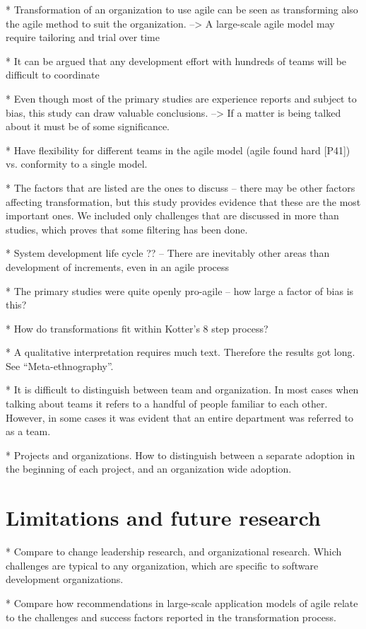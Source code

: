 \documentclass[preprint,authoryear,12pt]{elsarticle}
\begin{document}
* Transformation of an organization to use agile can be seen as transforming
  also the agile method to suit the organization.
  --> A large-scale agile model may require tailoring and trial over time

* It can be argued that any development effort with hundreds of teams will be
  difficult to coordinate

* Even though most of the primary studies are experience reports and subject to
  bias, this study can draw valuable conclusions. --> If a matter is being
  talked about it must be of some significance.

* Have flexibility for different teams in the agile model (agile found
  hard [P41]) vs. conformity to a single model. 

* The factors that are listed are the ones to discuss -- there may be other
  factors affecting transformation, but this study provides evidence that these
  are the most important ones. We included only challenges that are discussed in
  more than studies, which proves that some filtering has been done.

* System development life cycle ?? -- There are inevitably other areas than
  development of increments, even in an agile process

* The primary studies were quite openly pro-agile -- how large a factor of bias
  is this?

* How do transformations fit within Kotter's 8 step process?

* A qualitative interpretation requires much text. Therefore the results got
  long. See ``Meta-ethnography''.

* It is difficult to distinguish between team and organization. In most cases
  when talking about teams it refers to a handful of people familiar to each
  other. However, in some cases it was evident that an entire department was
  referred to as a team.

* Projects and organizations. How to distinguish between a separate adoption in
  the beginning of each project, and an organization wide adoption.


\section{Limitations and future research}
\label{sec:conclusion}

* Compare to change leadership research, and organizational research. Which
  challenges are typical to any organization, which are specific to software
  development organizations.

* Compare how recommendations in large-scale application models of agile relate
  to the challenges and success factors reported in the transformation process. 






\end{document}

